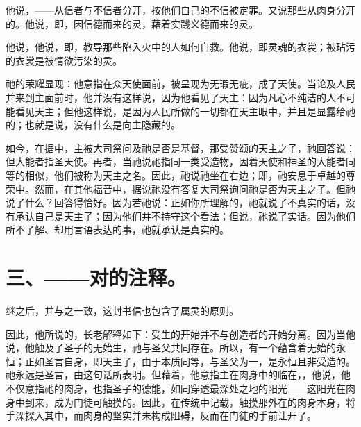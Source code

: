 他说，——从信者与不信者分开，按他们自己的不信被定罪。又说那些从肉身分开的。他说，即，因信德而来的灵，藉着实践义德而来的灵。\par

他说，他说，即，教导那些陷入火中的人如何自救。他说，即灵魂的衣裳；被玷污的衣裳是被情欲污染的灵。\par

祂的荣耀显现：他意指在众天使面前，被呈现为无瑕无疵，成了天使。当论及人民并来到主面前时，他并没有这样说，因为他看见了天主：因为凡心不纯洁的人不可能看见天主；但他这样说，是因为人民所做的一切都在天主眼中，并且是显露给祂的；也就是说，没有什么是向主隐藏的。\par

如今，在据中，主被大司祭问及祂是否是基督，那受赞颂的天主之子，祂回答说：但大能者指圣天使。再者，当祂说祂指同一类受造物，因着天使和神圣的大能者同等的相似，他们被称为天主之名。因此，祂说祂坐在右边；即，祂安息于卓越的尊荣中。然而，在其他福音中，据说祂没有答复大司祭询问祂是否为天主之子。但祂说了什么？回答得恰好。因为若祂说：正如你所理解的，祂就说了不真实的话，没有承认自己是天主子；因为他们并不持守这个看法；但说，祂说了实话。因为他们所不了解、却用言语表达的事，祂就承认是真实的。\par


\section{三、——对的注释。}

\par

继之后，并与之一致，这封书信也包含了属灵的原则。\par

因此，他所说的，长老解释如下：受生的开始并不与创造者的开始分离。因为当他说，他触及了圣子的无始生，祂与圣父共同存在。所以，有一个蕴含着无始的永恒；正如圣言自身，即天主子，由于本质同等，与圣父为一，是永恒且非受造的。祂永远是圣言，由这句话所表明。但藉着，他意指主在肉身中的临在，，他说，他不仅意指祂的肉身，也指圣子的德能，如同穿透最深处之地的阳光——这阳光在肉身中到来，成为门徒可触摸的。因此，在传统中记载，触摸那外在的肉身本身，将手深探入其中，而肉身的坚实并未构成阻碍，反而在门徒的手前让开了。\par

